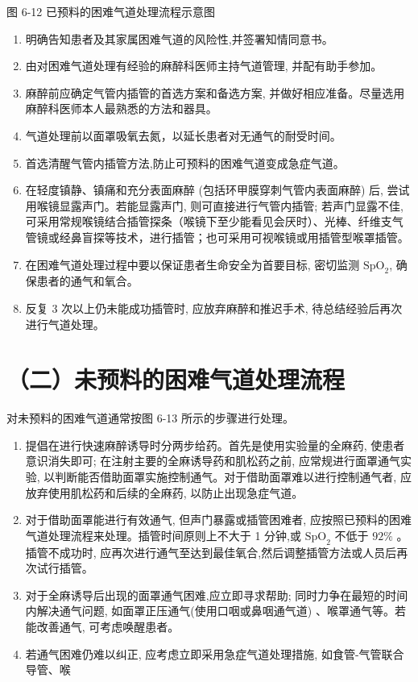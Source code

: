 \documentclass[10pt]{article}
\begin{document}
图 6-12 已预料的困难气道处理流程示意图

\begin{enumerate}
  \item 明确告知患者及其家属困难气道的风险性,并签署知情同意书。

  \item 由对困难气道处理有经验的麻醉科医师主持气道管理, 并配有助手参加。

  \item 麻醉前应确定气管内插管的首选方案和备选方案, 并做好相应准备。尽量选用麻醉科医师本人最熟悉的方法和器具。

  \item 气道处理前以面罩吸氧去氮，以延长患者对无通气的耐受时间。

  \item 首选清醒气管内插管方法,防止可预料的困难气道变成急症气道。

  \item 在轻度镇静、镇痛和充分表面麻醉 (包括环甲膜穿刺气管内表面麻醉) 后, 尝试用喉镜显露声门。若能显露声门, 则可直接进行气管内插管; 若声门显露不佳, 可采用常规喉镜结合插管探条（喉镜下至少能看见会厌时）、光棒、纤维支气管镜或经鼻盲探等技术，进行插管；也可采用可视喉镜或用插管型喉罩插管。

  \item 在困难气道处理过程中要以保证患者生命安全为首要目标, 密切监测 $\mathrm{SpO}_{2}$, 确保患者的通气和氧合。

  \item 反复 3 次以上仍未能成功插管时, 应放弃麻醉和推迟手术, 待总结经验后再次进行气道处理。

\end{enumerate}

\section*{（二）未预料的困难气道处理流程}
对未预料的困难气道通常按图 6-13 所示的步骤进行处理。

\begin{enumerate}
  \item 提倡在进行快速麻醉诱导时分两步给药。首先是使用实验量的全麻药, 使患者意识消失即可; 在注射主要的全麻诱导药和肌松药之前, 应常规进行面罩通气实验, 以判断能否借助面罩实施控制通气。对于借助面罩难以进行控制通气者, 应放弃使用肌松药和后续的全麻药, 以防止出现急症气道。

  \item 对于借助面罩能进行有效通气, 但声门暴露或插管困难者, 应按照已预料的困难气道处理流程来处理。插管时间原则上不大于 1 分钟,或 $\mathrm{SpO}_{2}$ 不低于 $92 \%$ 。插管不成功时, 应再次进行通气至达到最佳氧合,然后调整插管方法或人员后再次试行插管。

  \item 对于全麻诱导后出现的面罩通气困难,应立即寻求帮助; 同时力争在最短的时间内解决通气问题, 如面罩正压通气(使用口咽或鼻咽通气道) 、喉罩通气等。若能改善通气, 可考虑唤醒患者。

  \item 若通气困难仍难以纠正, 应考虑立即采用急症气道处理措施, 如食管-气管联合导管、喉

\end{enumerate}
\end{document}
